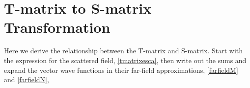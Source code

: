 %
%
%
%
%
%

\clearpage
\newpage

\section{T-matrix to S-matrix Transformation}
\label{secTtoS}

Here we derive the relationship between the T-matrix and S-matrix. Start with the expression for the scattered field, \eqref{tmatrixesca}, then write out the sums and expand the vector wave functions in their far-field approximations, \eqref{farfieldM} and \eqref{farfieldN}, 

